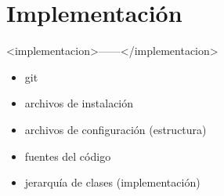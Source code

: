 \chapter{Implementación}
\label{chap:implementación}

<implementacion>------</implementacion>

\begin{itemize}
\item git
\item archivos de instalación
\item archivos de configuración (estructura)
\item fuentes del código
\item jerarquía de clases (implementación)
\end{itemize}
